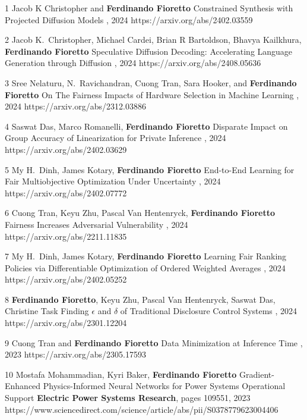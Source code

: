 \documentclass[localFont,alternative]{documentMETADATA}
\begin{document}
\begin{pubs}

\confentryShort
	{1}
	{Jacob K Christopher and {\bf Ferdinando Fioretto}}
	{Constrained Synthesis with Projected Diffusion Models}
	{\procNeurIPS, 2024}
	{https://arxiv.org/abs/2402.03559}

\confentryShort
	{2}
	{Jacob K.~Christopher, Michael Cardei, Brian R Bartoldson, Bhavya Kailkhura, {\bf Ferdinando Fioretto}}
	{Speculative Diffusion Decoding: Accelerating Language Generation through Diffusion}
	{\procNeurIPS, 2024}
	{https://arxiv.org/abs/2408.05636}

\confentryShort
	{3}
	{Sree Nelaturu, N.~Ravichandran, Cuong Tran, Sara Hooker, and {\bf Ferdinando Fioretto}}
	{On The Fairness Impacts of Hardware Selection in Machine Learning}	
	{\procICML, 2024}
	{https://arxiv.org/abs/2312.03886}

\confentryShort
	{4}
	{Saswat Das, Marco Romanelli, {\bf Ferdinando Fioretto}}
	{Disparate Impact on Group Accuracy of Linearization for Private Inference}
	{\procICML, 2024}
	{https://arxiv.org/abs/2402.03629}
	
\confentryShort
	{5}
	{My H.~Dinh, James Kotary, {\bf Ferdinando Fioretto}}
	{End-to-End Learning for Fair Multiobjective Optimization Under Uncertainty}
	{\procUAI, 2024}
	{https://arxiv.org/abs/2402.07772}

\confentryShort
	{6}%
	{Cuong Tran, Keyu Zhu, Pascal Van Hentenryck, {\bf Ferdinando Fioretto}}
	{Fairness Increases Adversarial Vulnerability}
	{\procIJCAI, 2024}
	{https://arxiv.org/abs/2211.11835}

\confentryShort
	{7}
	{My H.~Dinh, James Kotary, {\bf Ferdinando Fioretto}}
	{Learning Fair Ranking Policies via Differentiable Optimization of Ordered Weighted Averages}
	{\procFAccT, 2024}
	{https://arxiv.org/abs/2402.05252}

\confentryShort
	{8}
	{{\bf Ferdinando Fioretto}, Keyu Zhu, Pascal Van Hentenryck, Saswat Das, Christine Task}
	{Finding $\epsilon$ and $\delta$ of Traditional Disclosure Control Systems}
	{\procAAAI, 2024}
	{https://arxiv.org/abs/2301.12204}

\confentryShort
	{9}
	{{Cuong Tran} and {\bf Ferdinando Fioretto}}
	{Data Minimization at Inference Time}
	{\procNeurIPS, 2023}
	{https://arxiv.org/abs/2305.17593}

\confentryShort
	{10}
	{Mostafa Mohammadian, Kyri Baker, \textbf{Ferdinando Fioretto}}
	{Gradient-Enhanced Physics-Informed Neural Networks for Power Systems Operational Support}
	{\textbf{Electric Power Systems Research}, pages 109551, 2023}
	{https://www.sciencedirect.com/science/article/abs/pii/S0378779623004406}


\end{pubs}
\end{document}
